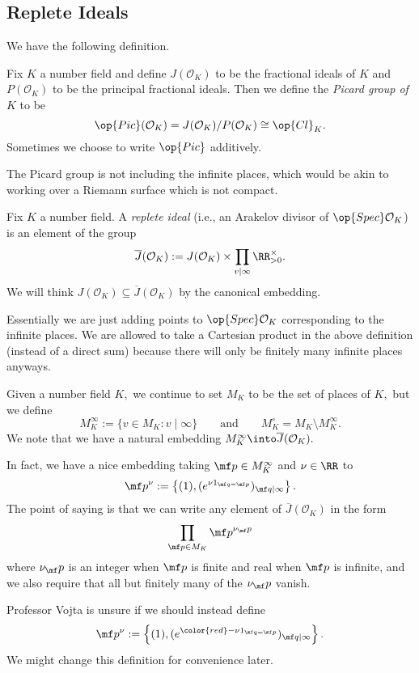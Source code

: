 \documentclass[../notes.tex]{subfiles}
\begin{document}
\subsection{Replete Ideals}
We have the following definition.
\begin{definition}
	Fix $K$ a number field and define $J(\mathcal O_K)$ to be the fractional ideals of $K$ and $P(\mathcal O_K)$ to be the principal fractional ideals. Then we define the \textit{Picard group of $K$} to be
	\[\op{Pic}(\mathcal O_K)=J(\mathcal O_K)/P(\mathcal O_K)\cong\op{Cl}_K.\]
	Sometimes we choose to write $\op{Pic}$ additively.
\end{definition}
The Picard group is not including the infinite places, which would be akin to working over a Riemann surface which is not compact.
\begin{definition}
	Fix $K$ a number field. A \textit{replete ideal} (i.e., an Arakelov divisor of $\op{Spec}\mathcal O_K$) is an element of the group
	\[\overline J(\mathcal O_K):=J(\mathcal O_K)\times\prod_{v\mid\infty}\RR^\times_{>0}.\]
	We will think $J(\mathcal O_K)\subseteq\overline J(\mathcal O_K)$ by the canonical embedding.
\end{definition}
Essentially we are just adding points to $\op{Spec}\mathcal O_K$ corresponding to the infinite places. We are allowed to take a Cartesian product in the above definition (instead of a direct sum) because there will only be finitely many infinite places anyways.
\begin{definition}
	Given a number field $K,$ we continue to set $M_K$ to be the set of places of $K,$ but we define
	\[M_K^\infty:=\{v\in M_K:v\mid\infty\}\qquad\text{and}\qquad M_K^\circ=M_K\setminus M_K^\infty.\]
	We note that we have a natural embedding $M_K^\infty\into\overline J(\mathcal O_K).$
\end{definition}
In fact, we have a nice embedding taking $\mf p\in M_K^\infty$ and $\nu\in\RR$ to
\[\mf p^\nu:=\left\{(1),(e^{\nu1_{\mf q=\mf p}})_{\mf q\mid\infty}\right\}.\]
The point of saying is that we can write any element of $\overline J(\mathcal O_K)$ in the form
\[\prod_{\mf p\in M_K}\mf p^{\nu_\mf p}\]
where $\nu_\mf p$ is an integer when $\mf p$ is finite and real when $\mf p$ is infinite, and we also require that all but finitely many of the $\nu_\mf p$ vanish.
\begin{remark}
	Professor Vojta is unsure if we should instead define
	\[\mf p^\nu:=\left\{(1),(e^{{\color{red}-}\nu1_{\mf q=\mf p}})_{\mf q\mid\infty}\right\}.\]
	We might change this definition for convenience later.
\end{remark}
\end{document}
